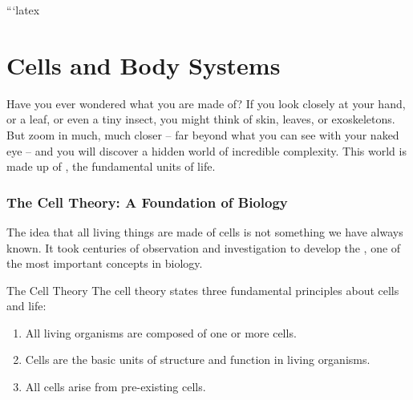 ```latex
\chapter{Cells and Body Systems}


\FloatBarrier

Have you ever wondered what you are made of?  If you look closely at your hand, or a leaf, or even a tiny insect, you might think of skin, leaves, or exoskeletons. But zoom in much, much closer – far beyond what you can see with your naked eye – and you will discover a hidden world of incredible complexity.  This world is made up of , the fundamental units of life.


\subsection{The Cell Theory: A Foundation of Biology}

The idea that all living things are made of cells is not something we have always known. It took centuries of observation and investigation to develop the , one of the most important concepts in biology.

\begin{keyconcept}{The Cell Theory}
The cell theory states three fundamental principles about cells and life:
\begin{enumerate}
    \item All living organisms are composed of one or more cells.
    \item Cells are the basic units of structure and function in living organisms.
    \item All cells arise from pre-existing cells.
\end{enumerate}
\end{keyconcept}

